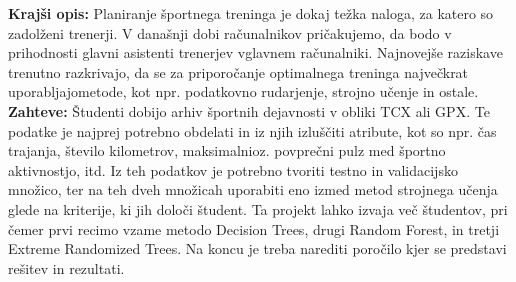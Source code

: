 \documentclass[a4paper,11pt]{article}
\begin{document}
\textbf{Krajši opis: } Planiranje športnega treninga je dokaj težka naloga, za katero so zadolženi
trenerji. V današnji dobi računalnikov pričakujemo, da bodo v prihodnosti glavni
asistenti trenerjev vglavnem računalniki. Najnovejše raziskave trenutno razkrivajo, da
se za priporočanje optimalnega treninga največkrat uporabljajometode, kot npr.
podatkovno rudarjenje, strojno učenje in ostale.\\

\textbf{Zahteve: } Študenti dobijo arhiv športnih dejavnosti v obliki TCX ali GPX. Te
podatke je najprej potrebno obdelati in iz njih izluščiti atribute, kot so npr. čas trajanja,
število kilometrov, maksimalnioz. povprečni pulz med športno aktivnostjo, itd. Iz teh
podatkov je potrebno tvoriti testno in validacijsko množico, ter na teh dveh množicah
uporabiti eno izmed metod strojnega učenja glede na kriterije, ki jih določi študent. Ta
projekt lahko izvaja več študentov, pri čemer prvi recimo vzame metodo Decision
Trees, drugi Random Forest, in tretji Extreme Randomized Trees. Na koncu je treba
narediti poročilo kjer se predstavi rešitev in rezultati.
\end{document}
